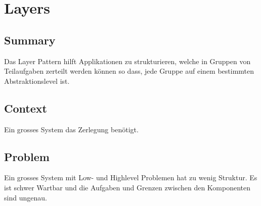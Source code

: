 \chapter{Layers}

\section{Summary}
Das Layer Pattern hilft Applikationen zu strukturieren, welche in Gruppen von Teilaufgaben zerteilt werden können so dass, jede Gruppe auf einem bestimmten Abstraktionslevel ist.
\section{Context}
Ein grosses System das Zerlegung benötigt.

\section{Problem}
Ein grosses System mit Low- und Highlevel Problemen hat zu wenig Struktur. Es ist schwer Wartbar und die Aufgaben und Grenzen zwischen den Komponenten sind ungenau.

